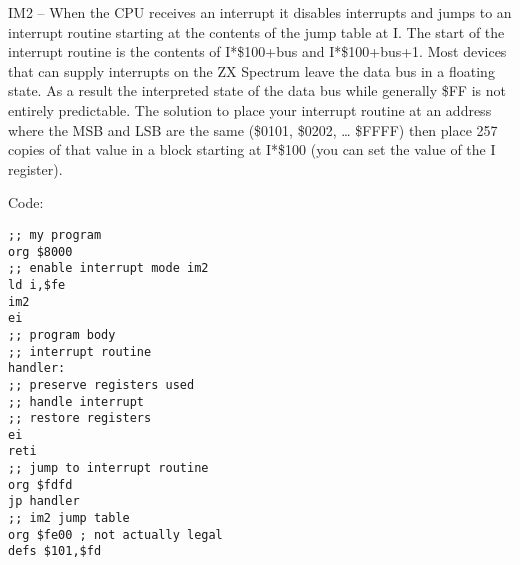 IM2 – When the CPU receives an interrupt it disables interrupts and
jumps to an interrupt routine starting at the contents of the jump
table at I. The start of the interrupt routine is the contents of
I*\$100+bus and I*\$100+bus+1. Most devices that can supply interrupts
on the ZX Spectrum leave the data bus in a floating state.  As a
result the interpreted state of the data bus while generally \$FF is
not entirely predictable.  The solution to place your interrupt
routine at an address where the MSB and LSB are the same (\$0101,
\$0202, … \$FFFF) then place 257 copies of that value in a block
starting at I*\$100 (you can set the value of the I register).

Code:
\begin{verbatim}
;; my program
org $8000
;; enable interrupt mode im2
ld i,$fe
im2
ei
;; program body
;; interrupt routine
handler:
;; preserve registers used
;; handle interrupt
;; restore registers
ei
reti
;; jump to interrupt routine
org $fdfd
jp handler
;; im2 jump table
org $fe00 ; not actually legal
defs $101,$fd
\end{verbatim}
